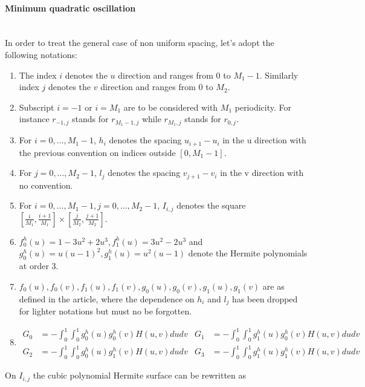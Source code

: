 \documentclass[a4paper, 11pt]{article}
\begin{document}
\paragraph{Minimum quadratic oscillation} \mbox{}\\

In order to treat the general case of non uniform spacing, let's adopt the following notations:

\begin{enumerate}
  \item The index $i$ denotes the $u$ direction and ranges from $0$ to $M_1-1$. Similarly index $j$ denotes the $v$ 
    direction and ranges from $0$ to $M_2$.
  \item Subscript $i=-1$ or $i=M_1$ are to be considered with $M_1$ periodicity. For instance $r_{-1, j}$ stands for 
    $r_{M_1-1,j}$ while $r_{M_1, j}$ stands for $r_{0,j}$.
  \item For $i=0, \ldots, M_1-1$, $h_i$ denotes the spacing $u_{i+1}-u_i$ in the u direction with the previous 
    convention on indices outside $[0, M_1-1]$.
  \item For $j=0, \ldots, M_2-1$, $l_j$ denotes the spacing $v_{j+1}-v_i$ in the v direction with no convention.
  \item For $i=0, \ldots, M_1-1, j=0, \ldots, M_2-1$, $I_{i,j}$ denotes the square $[\frac{i}{M_1}, 
    \frac{i+1}{M_1}]\times[\frac{j}{M_2}, \frac{j+1}{M_2}]$.
  \item $f_0^h(u) = 1-3u^2 + 2u^3, f_1^h(u) = 3u^2-2u^3$ and $g_0^h(u) = u{(u-1)}^2, g_1^h(u) = u^2(u-1)$ denote the 
    Hermite polynomials at order 3.
  \item $f_0(u), f_0(v), f_1(u), f_1(v), g_0(u), g_0(v), g_1(u), g_1(v)$ are as defined in the article, where the 
    dependence on $h_i$ and $l_j$ has been dropped for lighter notations but must no be forgotten.
  \item
    \begin{align*}
      G_0 &= -\int_0^1 \int_0^1 g_0^h(u) g_0^h(v)H(u,v)dudv & G_1 &= -\int_0^1 \int_0^1 g_1^h(u) g_0^h(v)H(u,v)dudv \\
      G_2 &= -\int_0^1 \int_0^1 g_0^h(u) g_1^h(v)H(u,v)dudv & G_3 &= -\int_0^1 \int_0^1 g_1^h(u) g_1^h(v)H(u,v)dudv
    \end{align*}
  \end{enumerate}


On $I_{i,j}$ the cubic polynomial Hermite surface can be rewritten as
\end{document}
